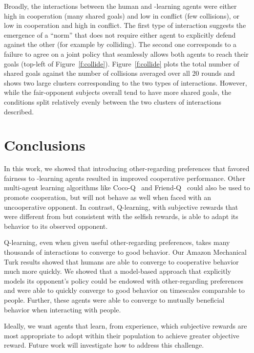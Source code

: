 \documentclass[letterpaper]{article}
\begin{document}
Broadly, the interactions between the human and \Q-learning agents were either high
in cooperation (many shared goals) and low in conflict (few
collisions), or low in cooperation and high in conflict. The first
type of interaction suggests the emergence of a ``norm'' that does not
require either agent to explicitly defend against the other (for
example by colliding). The second one corresponds to a failure to
agree on a joint policy that seamlessly allows both agents to reach
their goals (top-left of Figure~\ref{f:collide}). Figure~\ref{f:collide} plots the total number of shared
goals against the number of collisions averaged over all 20 rounds and
shows two large clusters corresponding to the two types of
interactions.  However, while the fair-opponent subjects overall tend
to have more shared goals, the conditions split relatively evenly
between the two clusters of interactions described.

\section{Conclusions}

In this work, we showed that introducing other-regarding preferences
that favored fairness to \Q-learning agents resulted in improved
cooperative performance. Other multi-agent learning algorithms like
Coco-Q~\cite{sodomka13} and Friend-Q~\cite{littman94} could also be
used to promote cooperation, but will not behave as well when faced with
an uncooperative opponent. In contrast, Q-learning, with subjective
rewards that were different from but consistent with the selfish
rewards, is able to adapt its behavior to its observed opponent.

Q-learning, even when given useful other-regarding preferences, takes
many thousands of interactions to converge to good behavior. Our
Amazon Mechanical Turk results showed that humans are able to converge
to cooperative behavior much more quickly. We showed that a
model-based approach that explicitly models its opponent's policy
could be endowed with other-regarding preferences and were able to
quickly converge to good behavior on timescales comparable to people. Further, these agents were able to converge to mutually beneficial behavior when interacting with people.

Ideally, we want agents that learn, from experience, which subjective
rewards are most appropriate to adopt within their population to
achieve greater objective reward. Future work will investigate how to
address this challenge.
\end{document}
